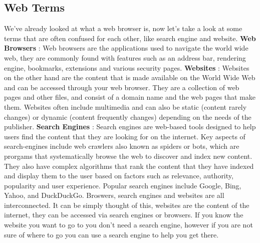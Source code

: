 \documentclass[11pt]{article}
\begin{document}
\subsection{Web Terms}
\label{sec:orgfde5296}
We've already looked at what a web browser is, now let's take a look at some terms that are often
confused for each other, like search engine and website.
\textbf{Web Browsers} : Web browsers are the applications used to navigate the world wide web, they are
commonly found with features such as an address bar, rendering engine, bookmarks, extensions and
various security pages.
\textbf{Websites} : Websites on the other hand are the content that is made available on the World Wide Web
and can be accessed through your web browser. They are a collection of web pages and other files,
and consist of a domain name and the web pages that make them. Websites often include multimedia and
can also be static (content rarely changes) or dynamic (content frequently changes) depending on the
needs of the publisher.
\textbf{Search Engines} : Search engines are web-based tools designed to help users find the content that
they are looking for on the internet. Key aspects of search-engines include web crawlers also known
as spiders or bots, which are prorgams that systematically browse the web to discover and index new
content. They also have complex algorithms that rank the content that they have indexed and display
them to the user based on factors such as relevance, authority, popularity and user experience.
Popular search engines include Google, Bing, Yahoo, and DuckDuckGo.
Broswers, search engines and websites are all interconnected. It can be simply thought of this,
websites are the content of the internet, they can be accessed via search engines or browsers. If
you know the website you want to go to you don't need a search engine, however if you are not sure
of where to go you can use a search engine to help you get there.
\end{document}
